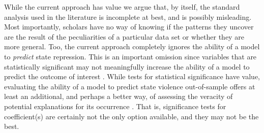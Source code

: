\documentclass[12pt]{article}
\begin{document}
While the current approach has value we argue that, by itself, the standard analysis used in the literature is incomplete at best, and is possibly misleading. Most importantly, scholars have no way of knowing if the patterns they uncover are the result of the peculiarities of a particular data set or whether they are more general. Too, the current approach completely ignores the ability of a model to {\em predict} state repression. This is an important omission since variables that are statistically significant may not meaningfully increase the ability of a model to predict the outcome of interest \citep{Wardetal2010}. While tests for statistical significance have value, evaluating the ability of a model to predict state violence out-of-sample offers at least an additional, and perhaps a better way, of assessing the veracity of potential explanations for its occurrence \citep[See, e.g.][]{BeckKingZeng2000}. That is, significance tests for coefficient(s) are certainly not the only option available, and they may not be the best. 
\end{document}
